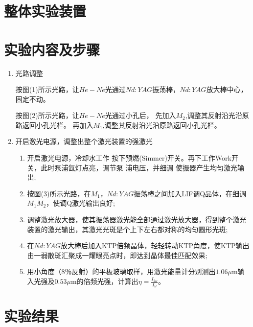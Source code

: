 \documentclass[UTF8]{ctexart}
\begin{document}
\section{整体实验装置}
\section{实验内容及步骤}
\begin{enumerate}
	\item 光路调整
	
	按图(1)所示光路，让$He-Ne$光通过$Nd:YAG$振荡棒，$Nd:YAG$放大棒中心，
	固定不动。
	
	按图(2)所示光路，让$He-Ne$光通过小孔后，
	先加入$M_{2}$,调整其反射沿光沿原路返回小孔光栏。
	再加入$M_{1}$,调整其反射沿光沿原路返回小孔光栏。
	
	\item 开启激光电源，调整出整个激光装置的强激光
	\begin{enumerate}
		\item 开启激光电源，冷却水工作
		按下预燃(Simmer)开关。再下工作Work开关，此时泵浦氙灯点亮，调节泵
		浦电压，并细调  使振器产生均匀激光输出;
		\item 按图(3)所示光路，在$M_{1}$，$Nd:YAG$振荡棒之间加入LIF调Q品体，在细调$M_{1}M_{2}$，使调Q激光输出良好;
		\item 调整激光放大器，使其振荡器激光能全部通过激光放大器，得到整个激光装置的激光输出，其激光光斑是个上下左右都对称的均匀圆形光斑;
		\item 在$Nd:YAG$放大棒后加入KTP倍频晶体，轻轻转动KTP角度，使KTP输出由一弱散斑汇聚成一耀眼亮点时，即达到晶体最佳匹配效果;
		\item 用小角度（8％反射）的平板玻璃取样，用激光能量计分别测出$1.06\mu$m输入光强及$0.53\mu$m的倍频光强，计算出$\eta=\frac{I_{2\omega}}{I_{\omega}}$。
		
	\end{enumerate}
\end{enumerate}
\section{实验结果}
\end{document}
